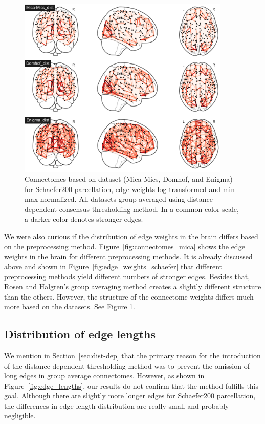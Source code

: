 \begin{figure}
\begin{center}
    \includegraphics[width=0.9\textwidth]{images/manually_created/datasets.png}
  \end{center}
  \caption[Connectomes based on dataset]{Connectomes based on dataset (Mica-Mics, Domhof, and Enigma) for Schaefer200 parcellation, edge weights log-transformed and min-max normalized. All datasets group averaged using distance dependent consensus thresholding method. In a common color scale, a darker color denotes stronger edges.}
  \label{fig:connectomes_by_dataset}
\end{figure}

We were also curious if the distribution of edge weights in the brain differs based on the preprocessing method. Figure~\ref{fig:connectomes_mica} shows the edge weights in the brain for different preprocessing methods. It is already discussed above and shown in Figure~\ref{fig:edge_weights_schaefer} that different preprocessing methods yield different numbers of stronger edges. Besides that, Rosen and Halgren's group averaging method creates a slightly different structure than the others. However, the structure of the connectome weights differs much more based on the datasets. See Figure \ref{fig:connectomes_by_dataset}. 

\subsection{Distribution of edge lengths}

We mention in Section~\ref{sec:dist-dep} that the primary reason for the introduction of the distance-dependent thresholding method was to prevent the omission of long edges in group average connectomes. However, as shown in Figure~\ref{fig:edge_lengths}, our results do not confirm that the method fulfills this goal. Although there are slightly more longer edges for Schaefer200 parcellation, the differences in edge length distribution are really small and probably negligible. 

